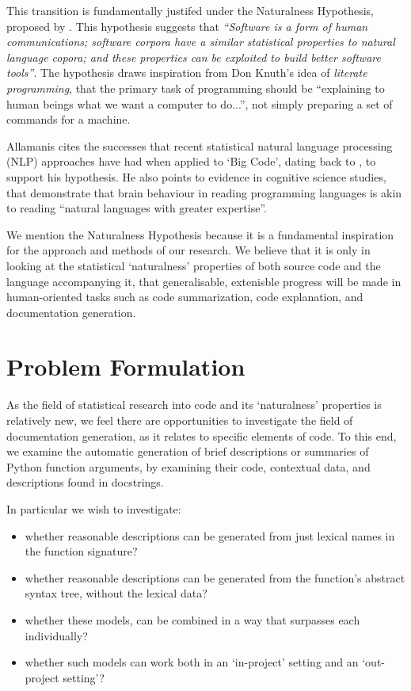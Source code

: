 This transition is fundamentally justifed under the Naturalness Hypothesis, proposed by \citet{allamanis_survey_2017}. 
This hypothesis suggests that \textit{``Software is a form of human communications; software corpora have a similar statistical properties to natural language copora; and these properties can be exploited to build better software tools''}.\citep{allamanis_survey_2017} 
The hypothesis draws inspiration from Don Knuth's idea of \textit{literate programming}\citep{knuth_literate_1984}, that the primary task of programming should be ``explaining to human beings what we want a computer to do...''\citep{knuth_literate_1984}, not simply preparing a set of commands for a machine.

Allamanis cites the successes that recent statistical natural language processing (NLP) approaches have had when applied to `Big Code', dating back to \citet{Hindle:2012:NS:2337223.2337322}, to support his hypothesis. He also points to evidence in cognitive science studies, that demonstrate that brain behaviour in reading programming languages is akin to reading ``natural languages with greater expertise''\citep{floyd_decoding_2017}.

We mention the Naturalness Hypothesis because it is a fundamental inspiration for the approach and methods of our research.
We believe that it is only in looking at the statistical `naturalness' properties of both source code and the language accompanying it, that generalisable, extenisble progress will be made in human-oriented tasks such as code summarization, code explanation, and documentation generation.


\section{Problem Formulation} %
\label{sec:problem_formulation}

As the field of statistical research into code and its `naturalness' properties is relatively new, we feel there are opportunities to investigate the field of documentation generation, as it relates to specific elements of code. 
To this end, we examine the automatic generation of brief descriptions or summaries of Python function arguments, by examining their code, contextual data, and descriptions found in docstrings.

In particular we wish to investigate:
\begin{itemize}
    \item whether reasonable descriptions can be generated from just lexical names in the function signature?
    \item whether reasonable descriptions can be generated from the function's abstract syntax tree, without the lexical data?
    \item whether these models, can be combined in a way that surpasses each individually?
    \item whether such models can work both in an `in-project' setting and an `out-project setting'?
\end{itemize}
 
